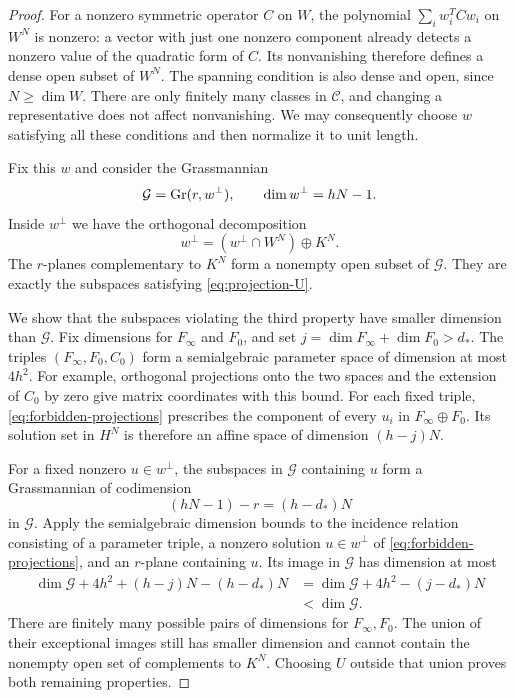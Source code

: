 \begin{proof}
For a nonzero symmetric operator $C$ on $W$, the polynomial
$\sum_i w_i^T Cw_i$ on $W^N$ is nonzero: a vector with just one
nonzero component already detects a nonzero value of the quadratic
form of $C$.  Its nonvanishing therefore defines a dense open subset
of $W^N$.  The spanning condition is also dense and open, since
$N\ge\dim W$.  There are only finitely many classes in
$\mathcal C$, and changing a representative does not affect
nonvanishing.  We may consequently choose $w$ satisfying all these
conditions and then normalize it to unit length.

Fix this $w$ and consider the Grassmannian
\[
 \mathcal G=\operatorname{Gr}(r,w^\perp),\qquad
 \dim w^\perp=hN-1.
\]
Inside $w^\perp$ we have the orthogonal decomposition
\[
 w^\perp=(w^\perp\cap W^N)\oplus K^N.
\]
The $r$-planes complementary to $K^N$ form a nonempty open subset
of $\mathcal G$.  They are exactly the subspaces satisfying
\eqref{eq:projection-U}.

We show that the subspaces violating the third property have smaller
dimension than $\mathcal G$.  Fix dimensions for $F_\infty$ and
$F_0$, and set $j=\dim F_\infty+\dim F_0>d_*$.  The triples
$(F_\infty,F_0,C_0)$ form a semialgebraic parameter space of
dimension at most $4h^2$.  For example, orthogonal projections onto
the two spaces and the extension of $C_0$ by zero give matrix
coordinates with this bound.  For each fixed triple,
\eqref{eq:forbidden-projections} prescribes the component of every
$u_i$ in $F_\infty\oplus F_0$.  Its solution set in $H^N$ is
therefore an affine space of dimension $(h-j)N$.

For a fixed nonzero $u\in w^\perp$, the subspaces in
$\mathcal G$ containing $u$ form a Grassmannian of codimension
\[
 (hN-1)-r=(h-d_*)N
\]
in $\mathcal G$.  Apply the semialgebraic dimension bounds to the
incidence relation consisting of a parameter triple, a nonzero
solution $u\in w^\perp$ of
\eqref{eq:forbidden-projections}, and an $r$-plane containing $u$.
Its image in $\mathcal G$ has dimension at most
\begin{align*}
 \dim\mathcal G+4h^2+(h-j)N-(h-d_*)N
 &=\dim\mathcal G+4h^2-(j-d_*)N\\
 &<\dim\mathcal G.
\end{align*}
There are finitely many possible pairs of dimensions for
$F_\infty,F_0$.  The union of their exceptional images still has
smaller dimension and cannot contain the nonempty open set of
complements to $K^N$.  Choosing $U$ outside that union proves both
remaining properties.
\end{proof}

